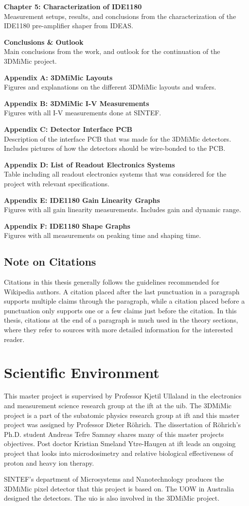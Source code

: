 \documentclass[../main/thesis.tex]{subfiles}
\begin{document}
\textbf{Chapter 5: Characterization of IDE1180}\\
Measurement setups, results, and conclusions from the characterization of the IDE1180 pre-amplifier shaper from IDEAS.

\textbf{Conclusions \& Outlook}\\
Main conclusions from the work, and outlook for the continuation of the 3DMiMic project.

\textbf{Appendix A: 3DMiMic Layouts}\\
Figures and explanations on the different 3DMiMic layouts and wafers. 

\textbf{Appendix B: 3DMiMic I-V Measurements}\\
Figures with all I-V measurements done at SINTEF.

\textbf{Appendix C: Detector Interface PCB}\\
Description of the interface PCB that was made for the 3DMiMic detectors. Includes pictures of how the detectors should be wire-bonded to the PCB. 

\textbf{Appendix D: List of Readout Electronics Systems}\\
Table including all readout electronics systems that was considered for the project with relevant specifications. 

\textbf{Appendix E: IDE1180 Gain Linearity Graphs}\\
Figures with all gain linearity measurements. Includes gain and dynamic range.

\textbf{Appendix F: IDE1180 Shape Graphs}\\
Figures with all measurements on peaking time and shaping time.


\subsection{Note on Citations}
Citations in this thesis generally follows the guidelines recommended for Wikipedia authors. A citation placed after the last punctuation in a paragraph supports multiple claims through the paragraph, while a citation placed before a punctuation only supports one or a few claims just before the citation. In this thesis, citations at the end of a paragraph is much used in the theory sections, where they refer to sources with more detailed information for the interested reader.

\newpage
\section{Scientific Environment}
\label{i-environment}
This master project is supervised by Professor Kjetil Ullaland in the electronics and measurement science research group at the \gls{ift} at the \gls{uib}. The 3DMiMic project is a part of the subatomic physics research group at \gls{ift} and this master project was assigned by Professor Dieter Röhrich. The dissertation of Röhrich's Ph.D. student Andreas Tefre Samnøy shares many of this master projects objectives. Post doctor Kristian Smeland Ytre-Haugen at \gls{ift} leads an ongoing project that looks into microdosimetry and relative biological effectiveness of proton and heavy ion therapy. 

SINTEF's department of Microsystems and Nanotechnology produces the 3DMiMic pixel detector that this project is based on. The \gls{UOW} in Australia designed the detectors. The \gls{uio} is also involved in the 3DMiMic project. 

\end{document}
